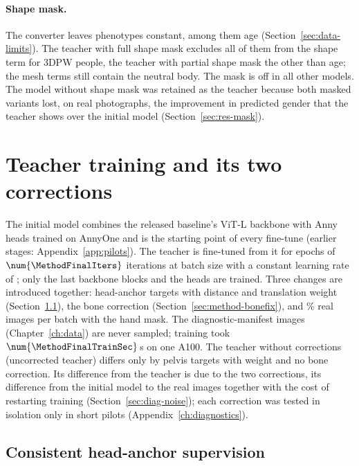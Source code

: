 \paragraph{Shape mask.} The converter leaves \MethodShapeMaskCount{} phenotypes constant, among them age
(Section~\ref{sec:data-limits}). The teacher with full shape mask
excludes all of them from the shape term for 3DPW people, the teacher with partial shape mask the
\MethodShapeMaskPartial{} other than age; the mesh terms still contain the neutral body. The mask is off in all other
models. The model without shape mask was retained as the teacher because both masked variants lost, on real photographs, the improvement in
predicted gender that the teacher shows over the initial model (Section~\ref{sec:res-mask}).

\section{Teacher training and its two corrections}
\label{sec:method-schedule}

The initial model combines the released baseline's ViT-L backbone with Anny heads trained on AnnyOne and is the starting point of every
fine-tune (earlier stages: Appendix~\ref{app:pilots}). The teacher is fine-tuned from it for \MethodFinalEpochs{} epochs of $\num{\MethodFinalIters}$ iterations at batch size
\MethodFinalBatch{} with a constant learning rate of \MethodFinalLR; only the last \MethodUnfrozenBlocks{} backbone
blocks and the heads are trained. Three changes are introduced together: head-anchor targets with distance and
translation weight \MethodWDist{} (Section~\ref{sec:method-depth}), the bone correction
(Section~\ref{sec:method-bonefix}), and \MethodMixRatio\% real images per batch with the hand mask. The
\MethodManifestImages{} diagnostic-manifest images (Chapter~\ref{ch:data}) are never sampled; training took
$\num{\MethodFinalTrainSec}$\,s on one A100. The teacher without corrections (uncorrected teacher) differs only by pelvis targets with
weight \MethodWDistDefault{} and no bone correction. Its difference from the teacher is due
to the two corrections, its difference from the initial model to the real images together with the cost of
restarting training (Section~\ref{sec:diag-noise}); each correction was tested in isolation only in short pilots (Appendix~\ref{ch:diagnostics}).

\subsection{Consistent head-anchor supervision}
\label{sec:method-depth}

